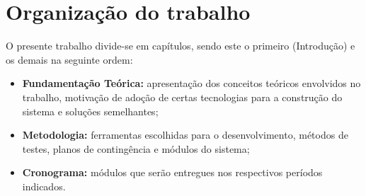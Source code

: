 \section{Organização do trabalho}
O presente trabalho divide-se em capítulos, sendo este o primeiro (Introdução) e os demais na seguinte ordem:

\begin{itemize}
  \item \textbf{Fundamentação Teórica:} apresentação dos conceitos teóricos envolvidos no trabalho, motivação de
  adoção de certas tecnologias para a construção do sistema e soluções semelhantes;
  \item \textbf{Metodologia:} ferramentas escolhidas para o desenvolvimento, métodos de testes, planos de contingência e módulos
  do sistema;
  \item \textbf{Cronograma:} módulos que serão entregues nos respectivos períodos indicados.
\end{itemize}
